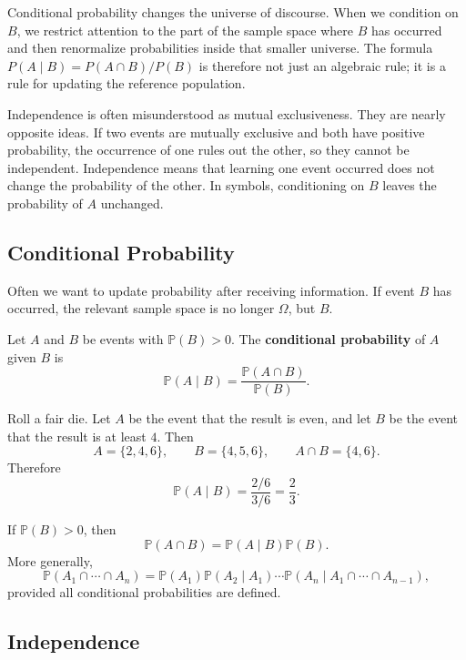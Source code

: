 Conditional probability changes the universe of discourse. When we condition on $B$, we restrict attention to the part of the sample space where $B$ has occurred and then renormalize probabilities inside that smaller universe. The formula $P(A\mid B)=P(A\cap B)/P(B)$ is therefore not just an algebraic rule; it is a rule for updating the reference population.

Independence is often misunderstood as mutual exclusiveness. They are nearly opposite ideas. If two events are mutually exclusive and both have positive probability, the occurrence of one rules out the other, so they cannot be independent. Independence means that learning one event occurred does not change the probability of the other. In symbols, conditioning on $B$ leaves the probability of $A$ unchanged.

\subsection{Conditional Probability}

Often we want to update probability after receiving information. If event $B$ has occurred, the relevant sample space is no longer $\Omega$, but $B$.

\begin{definition}
Let $A$ and $B$ be events with $\mathbb{P}(B)>0$. The \textbf{conditional probability} of $A$ given $B$ is
\[
    \mathbb{P}(A\mid B)=\frac{\mathbb{P}(A\cap B)}{\mathbb{P}(B)}.
\]
\end{definition}

\begin{example}
Roll a fair die. Let $A$ be the event that the result is even, and let $B$ be the event that the result is at least $4$. Then
\[
    A=\{2,4,6\},\qquad B=\{4,5,6\},\qquad A\cap B=\{4,6\}.
\]
Therefore
\[
    \mathbb{P}(A\mid B)=\frac{2/6}{3/6}=\frac23.
\]
\end{example}

\begin{proposition}
If $\mathbb{P}(B)>0$, then
\[
    \mathbb{P}(A\cap B)=\mathbb{P}(A\mid B)\mathbb{P}(B).
\]
More generally,
\[
    \mathbb{P}(A_1\cap\cdots\cap A_n)
    =\mathbb{P}(A_1)\mathbb{P}(A_2\mid A_1)\cdots\mathbb{P}(A_n\mid A_1\cap\cdots\cap A_{n-1}),
\]
provided all conditional probabilities are defined.
\end{proposition}

\subsection{Independence}


